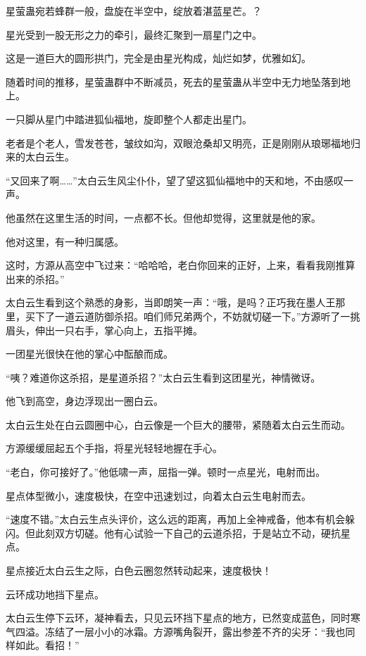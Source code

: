 
\begin{this_body}



星萤蛊宛若蜂群一般，盘旋在半空中，绽放着湛蓝星芒。？

星光受到一股无形之力的牵引，最终汇聚到一扇星门之中。

这是一道巨大的圆形拱门，完全是由星光构成，灿烂如梦，优雅如幻。

随着时间的推移，星萤蛊群中不断减员，死去的星萤蛊从半空中无力地坠落到地上。

一只脚从星门中踏进狐仙福地，旋即整个人都走出星门。

老者是个老人，雪发苍苍，皱纹如沟，双眼沧桑却又明亮，正是刚刚从琅琊福地归来的太白云生。

“又回来了啊……”太白云生风尘仆仆，望了望这狐仙福地中的天和地，不由感叹一声。

他虽然在这里生活的时间，一点都不长。但他却觉得，这里就是他的家。

他对这里，有一种归属感。

这时，方源从高空中飞过来：“哈哈哈，老白你回来的正好，上来，看看我刚推算出来的杀招。”

太白云生看到这个熟悉的身影，当即朗笑一声：“哦，是吗？正巧我在墨人王那里，买下了一道云道防御杀招。咱们师兄弟两个，不妨就切磋一下。”方源听了一挑眉头，伸出一只右手，掌心向上，五指平摊。

一团星光很快在他的掌心中酝酿而成。

“咦？难道你这杀招，是星道杀招？”太白云生看到这团星光，神情微讶。

他飞到高空，身边浮现出一圈白云。

太白云生处在白云圆圈中心，白云像是一个巨大的腰带，紧随着太白云生而动。

方源缓缓屈起五个手指，将星光轻轻地握在手心。

“老白，你可接好了。”他低啸一声，屈指一弹。顿时一点星光，电射而出。

星点体型微小，速度极快，在空中迅速划过，向着太白云生电射而去。

“速度不错。”太白云生点头评价，这么远的距离，再加上全神戒备，他本有机会躲闪。但此刻双方切磋。他有心试验一下自己的云道杀招，于是站立不动，硬抗星点。

星点接近太白云生之际，白色云圈忽然转动起来，速度极快！

云环成功地挡下星点。

太白云生停下云环，凝神看去，只见云环挡下星点的地方，已然变成蓝色，同时寒气四溢。冻结了一层小小的冰霜。方源嘴角裂开，露出参差不齐的尖牙：“我也同样如此。看招！”


\end{this_body}
